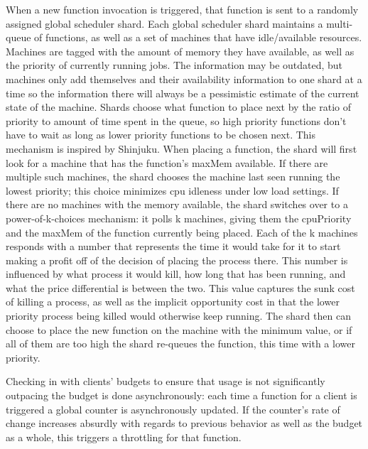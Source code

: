 When a new function invocation is triggered, that function is sent to a randomly
assigned global scheduler shard. Each global scheduler shard maintains a
multi-queue of functions, as well as a set of machines that have idle/available
resources. Machines are tagged with the amount of memory they have available, as
well as the priority of currently running jobs. The information may be outdated,
but machines only add themselves and their availability information to one shard
at a time so the information there will always be a pessimistic estimate of the
current state of the machine. Shards choose what function to place next by the
ratio of priority to amount of time spent in the queue, so high priority
functions don’t have to wait as long as lower priority functions to be chosen
next. This mechanism is inspired by Shinjuku.  When placing a function, the shard will
first look for a machine that has the function’s maxMem available. If there are
multiple such machines, the shard chooses the machine last seen running the
lowest priority; this choice minimizes cpu idleness under low load settings. If
there are no machines with the memory available, the shard switches over to a
power-of-k-choices mechanism: it polls k machines, giving them the cpuPriority
and the maxMem of the function currently being placed. Each of the k machines
responds with a number that represents the time it would take for it to start
making a profit off of the decision of placing the process there. This number is
influenced by what process it would kill, how long that has been running, and
what the price differential is between the two. This value captures the sunk
cost of killing a process, as well as the implicit opportunity cost in that the
lower priority process being killed would otherwise keep running. The shard then
can choose to place the new function on the machine with the minimum value, or
if all of them are too high the shard re-queues the function, this time with a
lower priority. 

Checking in with clients’ budgets to ensure that usage is not significantly
outpacing the budget is done asynchronously: each time a function for a client
is triggered a global counter is asynchronously updated. If the counter's rate
of change increases absurdly with regards to previous behavior as well as the
budget as a whole, this triggers a throttling for that function.

